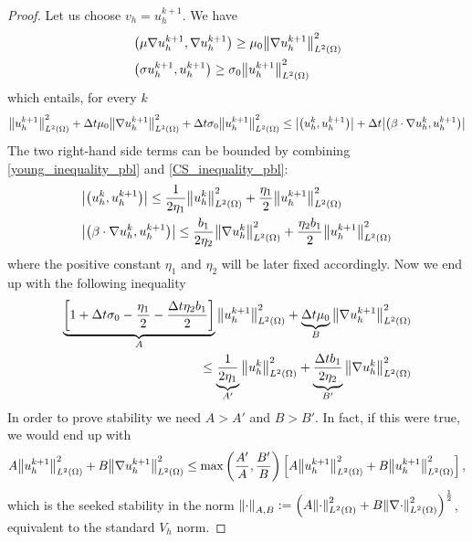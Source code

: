 \begin{proof}
    Let us choose \(v_h = u_h^{k+1}\). We have 
    \begin{align*}
        & \left( \mu \nabla u_h^{k+1}, \nabla u_h^{k+1} \right) \geq \mu_0 \norm{\nabla u_h^{k+1}}_{L^2(\Omega)}^2 \\
        & \left( \sigma u_h^{k+1}, u_h^{k+1} \right) \geq \sigma_0 \norm{u_h^{k+1}}_{L^2(\Omega)}^2
    \end{align*}
    which entails, for every \(k\)
    \begin{equation*}
        \begin{split}
            \norm{u_h^{k+1}}_{L^2(\Omega)}^2 + \Delta t \mu_0 \norm{\nabla u_h^{k+1}}_{L^2(\Omega)}^2 + \Delta t \sigma_0 \norm{u_h^{k+1}}_{L^2(\Omega)}^2 \leq \abs{\left( u_h^{k}, u_h^{k+1} \right)} + \Delta t \abs{\left( \beta \cdot \nabla u_h^{k}, u_h^{k+1} \right)}
        \end{split}
    \end{equation*}
    The two right-hand side terms can be bounded by combining \eqref{young_inequality_pbl} and \eqref{CS_inequality_pbl}: 
    \begin{align*}
        & \abs{\left( u_h^{k}, u_h^{k+1} \right)} \leq \frac{1}{2 \eta_1} \norm{u_h^{k}}_{L^2(\Omega)}^2 + \frac{\eta_1}{2} \norm{u_h^{k+1}}_{L^2(\Omega)}^2 \\
        & \abs{\left( \beta \cdot \nabla u_h^{k}, u_h^{k+1} \right)} \leq \frac{b_1}{2\eta_2} \norm{\nabla u_h^{k}}_{L^2(\Omega)}^2 + \frac{\eta_2 b_1}{2} \norm{u_h^{k+1}}_{L^2(\Omega)}^2
    \end{align*}
    where the positive constant \(\eta_1\) and \(\eta_2\) will be later fixed accordingly. Now we end up with the following inequality
    \begin{equation*}
        \begin{split}
            \underbrace{\left[ 1 + \Delta t \sigma_0 - \frac{\eta_1}{2} - \frac{\Delta t \eta_2 b_1}{2} \right]}_{A} \norm{u_h^{k+1}}_{L^2(\Omega)}^2 + \underbrace{\Delta t\mu_0}_{B} \norm{\nabla u_h^{k+1}}_{L^2(\Omega)}^2 \\
            \leq \underbrace{\frac{1}{2\eta_1}}_{A'} \norm{u_h^{k}}_{L^2(\Omega)}^2 + \underbrace{\frac{\Delta t b_1}{2 \eta_2}}_{B'} \norm{\nabla u_h^{k}}_{L^2(\Omega)}^2 
        \end{split}
    \end{equation*}
    In order to prove stability we need \(A > A'\) and \(B > B'\). In fact, if this were true, we would end up with 
    \[
        A\norm{u_h^{k+1}}_{L^2(\Omega)}^2 + B\norm{\nabla u_h^{k+1}}_{L^2(\Omega)}^2 \leq \max\left( \frac{A'}{A}, \frac{B'}{B} \right) \left[ A\norm{u_h^{k+1}}_{L^2(\Omega)}^2 + B \norm{u_h^{k+1}}_{L^2(\Omega)}^2 \right],
    \]
    which is the seeked stability in the norm \(\norm{\cdot}_{A,B}:= \left( A\norm{\cdot}_{L^2(\Omega)}^2 + B\norm{\nabla \cdot}_{L^2(\Omega)}^2 \right)^{\frac{1}{2}}\), equivalent to the standard \(V_h\) norm.


\end{proof}
